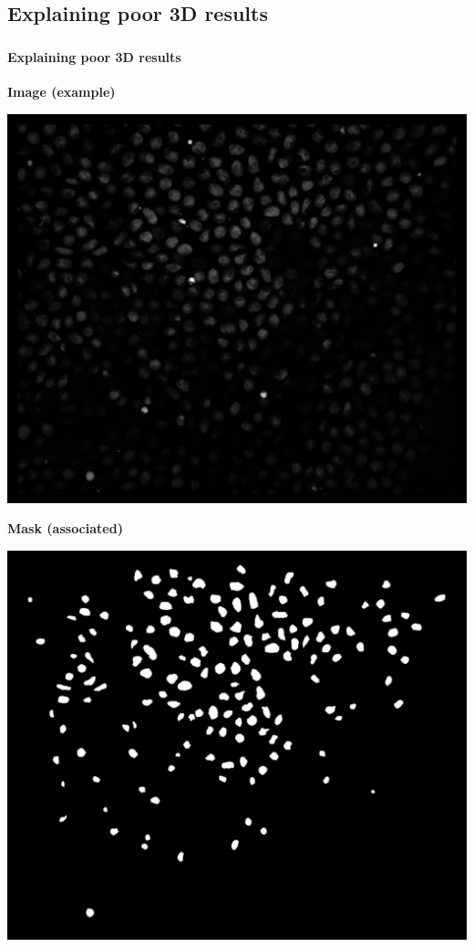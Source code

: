 \def\slidetitle{Explaining poor 3D results}

\subsection{\slidetitle}
\begin{frame}
  \frametitle{\sectiontitle}
  \framesubtitle{\slidetitle}

  \begin{minipage}[h!]{0.30\textwidth}
    \centering
    \textbf{Image (example)}\par\medskip
    \includegraphics[scale=0.1]{./img/result_img.png}
  \end{minipage}\hfill
  \begin{minipage}[h!]{0.30\textwidth}
    \centering
    \textbf{Mask (associated)}\par\medskip
    \includegraphics[scale=0.1]{./img/result_mask.png}

\end{minipage}
\end{frame}
